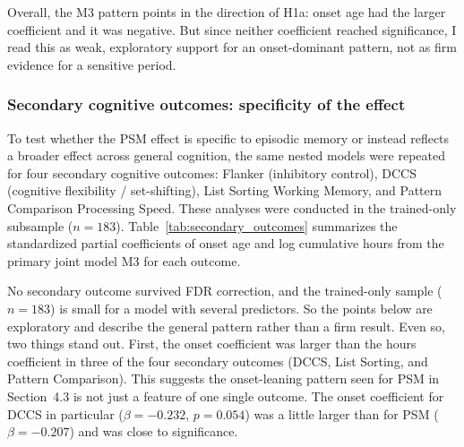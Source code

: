 \documentclass[11pt]{article}
\begin{document}
Overall, the M3 pattern points in the direction of H1a: onset age had the larger coefficient and it was negative. But since neither coefficient reached significance, I read this as weak, exploratory support for an onset-dominant pattern, not as firm evidence for a sensitive period.

\subsubsection{Secondary cognitive outcomes: specificity of the effect}

To test whether the PSM effect is specific to episodic memory or instead reflects a broader effect across general cognition, the same nested models were repeated for four secondary cognitive outcomes: Flanker (inhibitory control), DCCS (cognitive flexibility / set-shifting), List Sorting Working Memory, and Pattern Comparison Processing Speed. These analyses were conducted in the trained-only subsample ($n=183$). Table~\ref{tab:secondary_outcomes} summarizes the standardized partial coefficients of onset age and log cumulative hours from the primary joint model M3 for each outcome.

\begin{table}[ht]
\centering
\caption{Standardized partial regression coefficients from M3, in which onset age and log cumulative hours were entered jointly. The trained-only subsample was used ($n=183$). PSM, the primary outcome, is included for comparison.}
\label{tab:secondary_outcomes}
\end{table}

No secondary outcome survived FDR correction, and the trained-only sample ($n=183$) is small for a model with several predictors. So the points below are exploratory and describe the general pattern rather than a firm result. Even so, two things stand out. First, the onset coefficient was larger than the hours coefficient in three of the four secondary outcomes (DCCS, List Sorting, and Pattern Comparison). This suggests the onset-leaning pattern seen for PSM in Section~4.3 is not just a feature of one single outcome. The onset coefficient for DCCS in particular ($\beta=-0.232$, $p=0.054$) was a little larger than for PSM ($\beta=-0.207$) and was close to significance.
\end{document}
